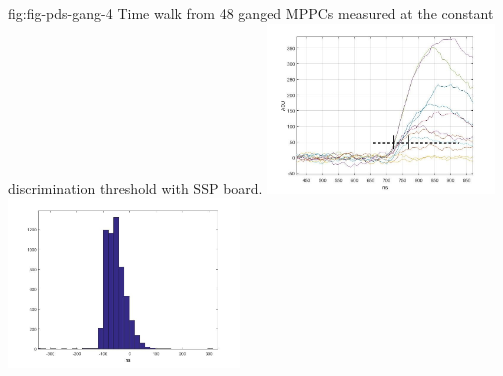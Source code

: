 \begin{dunefigure}
 {fig:fig-pds-gang-4}
 {Time walk from 48 ganged MPPCs measured at the constant discrimination threshold with SSP board.}
\includegraphics[height=4.5cm]{graphics/pds_gang_fig7.jpg}
\includegraphics[height=4.5cm]{graphics/pds_gang_fig8.jpg}
\end{dunefigure}




